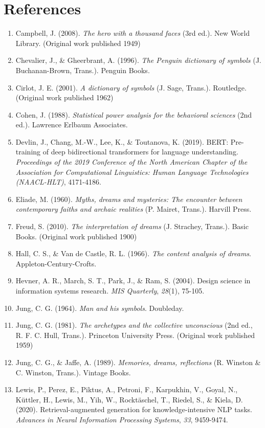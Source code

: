 \documentclass[12pt,a4paper]{report}
\begin{document}
\chapter*{References}
\begin{enumerate}
\item Campbell, J. (2008). \textit{The hero with a thousand faces} (3rd ed.). New World Library. (Original work published 1949)
\item Chevalier, J., \& Gheerbrant, A. (1996). \textit{The Penguin dictionary of symbols} (J. Buchanan-Brown, Trans.). Penguin Books.
\item Cirlot, J. E. (2001). \textit{A dictionary of symbols} (J. Sage, Trans.). Routledge. (Original work published 1962)
\item Cohen, J. (1988). \textit{Statistical power analysis for the behavioral sciences} (2nd ed.). Lawrence Erlbaum Associates.
\item Devlin, J., Chang, M.-W., Lee, K., \& Toutanova, K. (2019). BERT: Pre-training of deep bidirectional transformers for language understanding. \textit{Proceedings of the 2019 Conference of the North American Chapter of the Association for Computational Linguistics: Human Language Technologies (NAACL-HLT)}, 4171-4186.
\item Eliade, M. (1960). \textit{Myths, dreams and mysteries: The encounter between contemporary faiths and archaic realities} (P. Mairet, Trans.). Harvill Press.
\item Freud, S. (2010). \textit{The interpretation of dreams} (J. Strachey, Trans.). Basic Books. (Original work published 1900)
\item Hall, C. S., \& Van de Castle, R. L. (1966). \textit{The content analysis of dreams}. Appleton-Century-Crofts.
\item Hevner, A. R., March, S. T., Park, J., \& Ram, S. (2004). Design science in information systems research. \textit{MIS Quarterly}, \textit{28}(1), 75-105.
\item Jung, C. G. (1964). \textit{Man and his symbols}. Doubleday.
\item Jung, C. G. (1981). \textit{The archetypes and the collective unconscious} (2nd ed., R. F. C. Hull, Trans.). Princeton University Press. (Original work published 1959)
\item Jung, C. G., \& Jaffe, A. (1989). \textit{Memories, dreams, reflections} (R. Winston \& C. Winston, Trans.). Vintage Books.
\item Lewis, P., Perez, E., Piktus, A., Petroni, F., Karpukhin, V., Goyal, N., Küttler, H., Lewis, M., Yih, W., Rocktäschel, T., Riedel, S., \& Kiela, D. (2020). Retrieval-augmented generation for knowledge-intensive NLP tasks. \textit{Advances in Neural Information Processing Systems}, \textit{33}, 9459-9474.

\end{enumerate}
\end{document}
